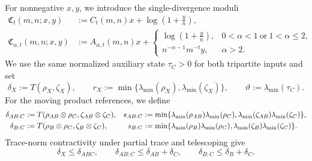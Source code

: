 \documentclass[11pt]{article}
\theoremstyle{remark}
\newcommand{\1}{\mathbbm{1}}
\begin{document}
For nonnegative $x,y$, we introduce the single-divergence moduli
\begin{align}
 \mathfrak C_t(m,n;x,y)
 &:=C_t(m,n)x+\log\left(1+\frac{y}{n}\right),
 \label{eq:three-orientation-Ct-modulus}\\
 \mathfrak C_{\alpha,t}(m,n;x,y)
 &:=A_{\alpha,t}(m,n)x+
 \begin{cases}
  \displaystyle\log\left(1+\frac{y}{n}\right),
  &0<\alpha<1\ \text{or}\ 1<\alpha\leq2,\\[2mm]
  \displaystyle n^{-\alpha-1}m^{-t}y,&\alpha>2.
 \end{cases}
 \label{eq:three-orientation-Calpha-modulus}
\end{align}
We use the same normalized auxiliary state $\tau_C>0$ for both
tripartite inputs and set
\begin{equation}
 \delta_X:=T(\rho_X,\zeta_X),
 \qquad
 r_X:=\min\{\lambda_{\min}(\rho_X),
             \lambda_{\min}(\zeta_X)\},
 \qquad
 \vartheta:=\lambda_{\min}(\tau_C).
 \label{eq:three-orientation-local-data}
\end{equation}
For the moving product references, we define
\begin{align}
 \delta_{AB:C}
 &:=T(\rho_{AB}\otimes\rho_C,
       \zeta_{AB}\otimes\zeta_C),
 &s_{AB:C}
 &:=\min\{\lambda_{\min}(\rho_{AB})\lambda_{\min}(\rho_C),
           \lambda_{\min}(\zeta_{AB})\lambda_{\min}(\zeta_C)\},
 \notag\\
 \delta_{B:C}
 &:=T(\rho_B\otimes\rho_C,
       \zeta_B\otimes\zeta_C),
 &s_{B:C}
 &:=\min\{\lambda_{\min}(\rho_B)\lambda_{\min}(\rho_C),
           \lambda_{\min}(\zeta_B)\lambda_{\min}(\zeta_C)\}.
 \label{eq:three-orientation-product-data}
\end{align}
Trace-norm contractivity under partial trace
\cite[Eq.~(1.183)]{watrous2018theory} and telescoping give
\begin{equation}
 \delta_X\leq\delta_{ABC},
 \qquad
 \delta_{AB:C}\leq\delta_{AB}+\delta_C,
 \qquad
 \delta_{B:C}\leq\delta_B+\delta_C.
 \label{eq:three-orientation-distance-comparison}
\end{equation}
\end{document}
